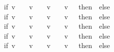 \begin{isabellebody}
\ \ \ \ \ \ \ \ \ \ \ \ \ \ \ \ \ \ \ \ \ \ \ \ \ \ \ \ \ \ {\isacharparenleft}if\ {\isacharparenleft}v\ {\isacharequal}\ {}\ {\isasymand}\ v\ {\isacharequal}\ {}{\isacharparenright}\ {\isasymor}\ {\isacharparenleft}v\ {\isacharequal}\ {}\ {\isasymand}\ v\ {\isacharequal}\ {}{\isacharparenright}\ then\ {}\ else\isanewline
\ \ \ \ \ \ \ \ \ \ \ \ \ \ \ \ \ \ \ \ \ \ \ \ \ \ \ \ \ \ {\isacharparenleft}if\ {\isacharparenleft}v\ {\isacharequal}\ {}\ {\isasymand}\ v\ {\isacharequal}\ {}{\isacharparenright}\ {\isasymor}\ {\isacharparenleft}v\ {\isacharequal}\ {}\ {\isasymand}\ v\ {\isacharequal}\ {}{\isacharparenright}\ then\ {}\ else\isanewline
\ \ \ \ \ \ \ \ \ \ \ \ \ \ \ \ \ \ \ \ \ \ \ \ \ \ \ \ \ \ {\isacharparenleft}if\ {\isacharparenleft}v\ {\isacharequal}\ {}\ {\isasymand}\ v\ {\isacharequal}\ {}{\isacharparenright}\ {\isasymor}\ {\isacharparenleft}v\ {\isacharequal}\ {}\ {\isasymand}\ v\ {\isacharequal}\ {}{\isacharparenright}\ then\ {}\ else\ \isanewline
\ \ \ \ \ \ \ \ \ \ \ \ \ \ \ \ \ \ \ \ \ \ \ \ \ \ \ \ \ \ {\isacharparenleft}if\ {\isacharparenleft}v\ {\isacharequal}\ {}\ {\isasymand}\ v\ {\isacharequal}\ {}{\isacharparenright}\ {\isasymor}\ {\isacharparenleft}v\ {\isacharequal}\ {}\ {\isasymand}\ v\ {\isacharequal}\ {}{\isacharparenright}\ then\ {}\ else\isanewline
\ \ \ \ \ \ \ \ \ \ \ \ \ \ \ \ \ \ \ \ \ \ \ \ \ \ \ \ \ \ {\isacharparenleft}if\ {\isacharparenleft}v\ {\isacharequal}\ {}\ {\isasymand}\ v\ {\isacharequal}\ {}{\isacharparenright}\ {\isasymor}\ {\isacharparenleft}v\ {\isacharequal}\ {}\ {\isasymand}\ v\ {\isacharequal}\ {}{\isacharparenright}\ then\ {}\ else\ \isanewline
\ \ \ \ \ \ \ \ \ \ \ \ \ \ \ \ \ \ \ \ \ \ \ \ \ \ \ \ \ \ \ {}{\isacharparenright}{\isacharparenright}{\isacharparenright}{\isacharparenright}{\isacharparenright}{\isacharparenright}{\isachardoublequoteclose}\ \isanewline

\end{isabellebody}
